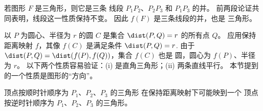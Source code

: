 \begin{exercises}
\begin{answer}
\begin{exparts}
          若图形 $F$ 是三角形，则它是三条
          线段 $P_1P_2$、$P_2P_3$ 和 $P_1P_3$ 的并。
          前两段论证共同表明，线段这一性质保持不变。
          因此 $f(F)$ 是三条线段的并，也是
          三角形。

          以 $P$ 为圆心、半径为 $r$ 的圆 $C$ 是集合
          $\dist(P,Q)=r$ 的所有点 $Q$。
          应用保持距离映射 $f$，其像
          $f(C)$ 是满足条件
          $\dist(P,Q)=r$.
          由于 $\dist(P,Q)=\dist(f(P),f(Q))$，集合 $f(C)$ 也是
          圆，圆心为 $f(P)$、半径为 $r$。
        \partsitem 以下两个性质容易验证：(i)
          是直角三角形；(ii)
          两条直线平行。
        \partsitem 本节提到的一个性质是图形的“方向”。

          顶点按顺时针顺序为 $P_1$、$P_2$、$P_3$ 的三角形
          在保持距离映射下可能映到一个
          顶点按逆时针顺序为 $P_1$、$P_2$、$P_3$ 的三角形。
      \end{exparts}
    \end{answer}
\end{exercises}
\endinput
